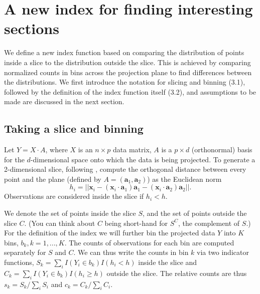 \documentclass[]{interact}
\theoremstyle{plain}%
\theoremstyle{definition}
\theoremstyle{remark}
\begin{document}
\hypertarget{a-new-index-for-finding-interesting-sections}{%
\section{\texorpdfstring{A new index for finding interesting sections
\label{sec:index}}{A new index for finding interesting sections }}\label{a-new-index-for-finding-interesting-sections}}

We define a new index function based on comparing the distribution of
points inside a slice to the distribution outside the slice. This is
achieved by comparing normalized counts in bins across the projection
plane to find differences between the distributions. We first introduce
the notation for slicing and binning (3.1), followed by the definition
of the index function itself (3.2), and assumptions to be made are
discussed in the next section.

\hypertarget{taking-a-slice-and-binning}{%
\subsection{Taking a slice and
binning}\label{taking-a-slice-and-binning}}

Let \(Y=X\cdot A\), where \(X\) is an \(n\times p\) data matrix, \(A\)
is a \(p\times d\) (orthonormal) basis for the \(d\)-dimensional space
onto which the data is being projected. To generate a 2-dimensional
slice, following \citet{laa2019slice}, compute the orthogonal distance
between every point and the plane (defined by
\(A = (\mathbf{a}_1, \mathbf{a}_2)\)) as the Euclidean norm
\begin{equation}
h_i = ||\mathbf{x}_i - (\mathbf{x}_i\cdot \mathbf{a}_1) \mathbf{a}_1 - (\mathbf{x}_i\cdot \mathbf{a}_2) \mathbf{a}_2||.
\end{equation} Observations are considered inside the slice if
\(h_i < h\).

We denote the set of points inside the slice \(S\), and the set of
points outside the slice \(C\). (You can think about \(C\) being
short-hand for \(S^C\), the complement of \(S\).) For the definition of
the index we will further bin the projected data \(Y\) into \(K\) bins,
\(b_k, k=1, ..., K\). The counts of observations for each bin are
computed separately for \(S\) and \(C\). We can thus write the counts in
bin \(k\) via two indicator functions,
\(S_{k}=\sum_{i} I(Y_i \in b_{k})I(h_i < h)\) inside the slice and
\(C_{k}=\sum_{i} I(Y_i \in b_{k})I(h_i \geq h)\) outside the slice. The
relative counts are thus \(s_k = S_k / \sum_i S_i\) and
\(c_k = C_k / \sum_i C_i\).
\end{document}
